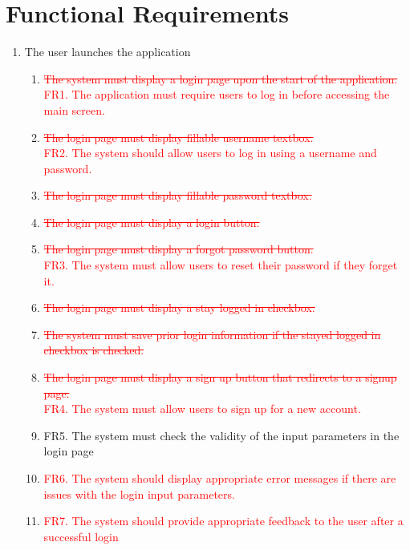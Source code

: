 \documentclass[12pt,letterpaper]{article}
\begin{document}
\clearpage

\section{Functional Requirements}
\begin{enumerate}[{BE}1.] 
	\item The user launches the application
	\begin{enumerate}[1.]
\item {\textcolor{red}{\sout{The system must display a login page upon the start of the application.}}} \\
{\textcolor{red}{FR1. The application must require users to log in before accessing the main screen.}}
\item {\textcolor{red}{\sout{The login page must display fillable username textbox.}}} \\
{\textcolor{red}{FR2. The system should allow users to log in using a username and password.}}
\item {\textcolor{red}{\sout{The login page must display fillable password textbox.}}} 
\item {\textcolor{red}{\sout{The login page must display a login button.}}} 
\item {\textcolor{red}{\sout{The login page must display a forgot password button.}}} \\
{\textcolor{red}{FR3. The system must allow users to reset their password if they forget it.}}
\item {\textcolor{red}{\sout{The login page must display a stay logged in checkbox.}}} 
\item {\textcolor{red}{\sout{The system must save prior login information if the stayed logged in checkbox is checked.}}} 
\item {\textcolor{red}{\sout{The login page must display a sign up button that redirects to a signup page.}}} \\
{\textcolor{red}{FR4. The system must allow users to sign up for a new account.}}
\item FR5. The system must check the validity of the input parameters in the login page
\item {\textcolor{red}{FR6. The system should display appropriate error messages if there are issues with the login input parameters.}}
\item {\textcolor{red}{FR7. The system should provide appropriate feedback to the user after a successful login}}
	\end{enumerate}
	

\end{enumerate}
\end{document}
